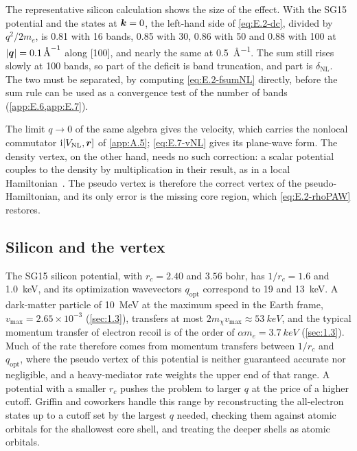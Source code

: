 The representative silicon calculation shows the size of the effect. With the SG15 potential and the states at $\bm{k} = 0$, the left-hand side of \cref{eq:E.2-dc}, divided by $q^2/2m_e$, is 0.81 with 16 bands, 0.85 with 30, 0.86 with 50 and 0.88 with 100 at $|\bm{q}| = \SI{0.1}{\angstrom^{-1}}$ along [100], and nearly the same at \SI{0.5}{\angstrom^{-1}}. The sum still rises slowly at 100 bands, so part of the deficit is band truncation, and part is $\delta_{\mathrm{NL}}$. The two must be separated, by computing \cref{eq:E.2-fsumNL} directly, before the sum rule can be used as a convergence test of the number of bands (\cref{app:E.6,app:E.7}).

The limit $q \to 0$ of the same algebra gives the velocity, which carries the nonlocal commutator $\mathrm{i}[V_{\mathrm{NL}}, \bm{r}]$ of \cref{app:A.5}; \cref{eq:E.7-vNL} gives its plane-wave form. The density vertex, on the other hand, needs no such correction: a scalar potential couples to the density by multiplication in their result, as in a local Hamiltonian~\cite[Eq.~(5)]{ismailbeigi2001coupling}. The pseudo vertex is therefore the correct vertex of the pseudo-Hamiltonian, and its only error is the missing core region, which \cref{eq:E.2-rhoPAW} restores.

\subsection{Silicon and the vertex}

The SG15 silicon potential, with $r_c = 2.40$ and $3.56$ bohr, has $1/r_c = 1.6$ and \SI{1.0}{keV}, and its optimization wavevectors $q_{\mathrm{opt}}$ correspond to 19 and \SI{13}{keV}. A dark-matter particle of \SI{10}{MeV} at the maximum speed in the Earth frame, $v_{\mathrm{max}} = 2.65\times10^{-3}$ (\cref{sec:1.3}), transfers at most $2m_\chi v_{\mathrm{max}} \approx \SI{53}{keV}$, and the typical momentum transfer of electron recoil is of the order of $\alpha m_e = \SI{3.7}{keV}$ (\cref{sec:1.3}). Much of the rate therefore comes from momentum transfers between $1/r_c$ and $q_{\mathrm{opt}}$, where the pseudo vertex of this potential is neither guaranteed accurate nor negligible, and a heavy-mediator rate weights the upper end of that range. A potential with a smaller $r_c$ pushes the problem to larger $q$ at the price of a higher cutoff. Griffin and coworkers handle this range by reconstructing the all-electron states up to a cutoff set by the largest $q$ needed, checking them against atomic orbitals for the shallowest core shell, and treating the deeper shells as atomic orbitals.


